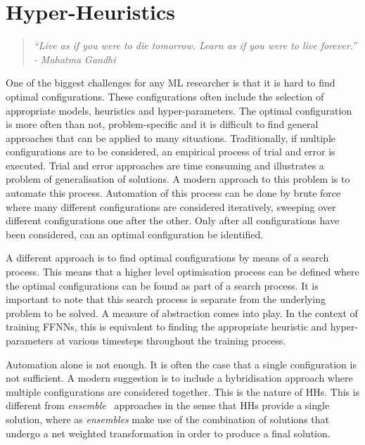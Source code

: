 \chapter{Hyper-Heuristics}
\label{chap:hhs}

\begin{quotation}
      \textit{``Live as if you were to die tomorrow. Learn as if you were to live forever.'' - Mahatma Gandhi}
\end{quotation}

One of the biggest challenges for any \ac{ML} researcher is that it is hard to find optimal configurations. These configurations often include the selection of appropriate models, heuristics and hyper-parameters. The optimal configuration is more often than not, problem-specific and it is difficult to find general approaches that can be applied to many situations. Traditionally, if multiple configurations are to be considered, an empirical process of trial and error is executed. Trial and error approaches are time consuming and illustrates a problem of generalisation of solutions. A modern approach to this problem is to automate this process. Automation of this process can be done by brute force where many different configurations are considered iteratively, sweeping over different configurations one after the other. Only after all configurations have been considered, can an optimal configuration be identified.

A different approach is to find optimal configurations by means of a search process. This means that a higher level optimisation process can be defined where the optimal configurations can be found as part of a search process. It is important to note that this search process is separate from the underlying problem to be solved. A measure of abstraction comes into play. In the context of training \acp{FFNN}, this is equivalent to finding the appropriate heuristic and hyper-parameters at various timesteps throughout the training process.

Automation alone is not enough. It is often the case that a single configuration is not sufficient. A modern suggestion is to include a hybridisation approach where multiple configurations are considered together. This is the nature of \acp{HH}. This is different from \textit{ensemble}~\cite{ref:dietterich:2002} approaches in the sense that \acp{HH} provide a single solution, where as \textit{ensembles} make use of the combination of solutions that undergo a net weighted transformation in order to produce a final solution.

